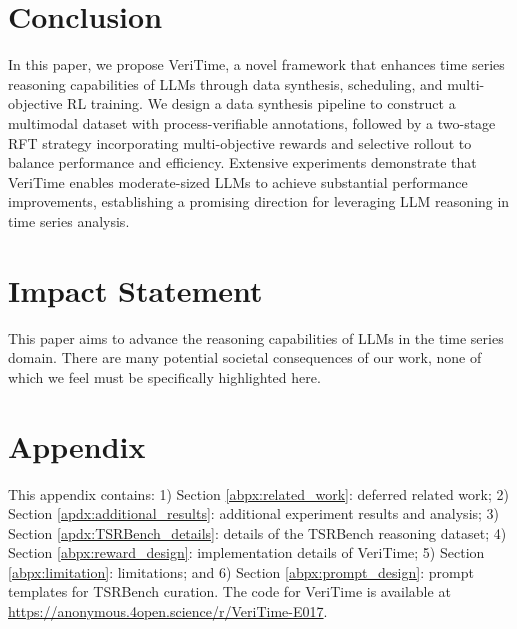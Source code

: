 \documentclass{article}
\theoremstyle{plain}
\theoremstyle{definition}
\theoremstyle{remark}
\begin{document}
\vspace{-0.8em}
\section{Conclusion}
In this paper, we propose VeriTime, a novel framework that enhances time series reasoning capabilities of LLMs through data synthesis, scheduling, and multi-objective RL training. We design a data synthesis pipeline to construct a multimodal dataset with process-verifiable annotations, followed by a two-stage RFT strategy incorporating multi-objective rewards and selective rollout to balance performance and efficiency. Extensive experiments demonstrate that VeriTime enables moderate-sized LLMs to achieve substantial performance improvements, establishing a promising direction for leveraging LLM reasoning in time series analysis.

\section*{Impact Statement}

This paper aims to advance the reasoning capabilities of LLMs in the time series domain. There are many potential societal consequences of our work, none of which we feel must be specifically highlighted here.


\nocite{langley00}




\newpage
\appendix
\onecolumn

\section*{Appendix}

This appendix contains: 1) Section \ref{abpx:related_work}: deferred related work; 2) Section \ref{apdx:additional_results}: additional experiment results and analysis; 3) Section \ref{apdx:TSRBench_details}: details of the TSRBench reasoning dataset; 4) Section \ref{abpx:reward_design}: implementation details of VeriTime; 5) Section \ref{abpx:limitation}: limitations; and 6) Section \ref{abpx:prompt_design}: prompt templates for TSRBench curation. The code for VeriTime is available at \url{https://anonymous.4open.science/r/VeriTime-E017}.
\end{document}
